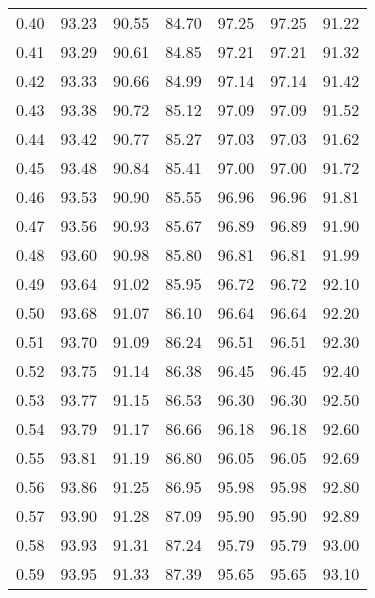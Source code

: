 \begin{tabular}{|c|c|c|c|c|c|c|}
      0.40 &     93.23 &     90.55 &      84.70 &   97.25 &      97.25 &         91.22 \\
      0.41 &     93.29 &     90.61 &      84.85 &   97.21 &      97.21 &         91.32 \\
      0.42 &     93.33 &     90.66 &      84.99 &   97.14 &      97.14 &         91.42 \\
      0.43 &     93.38 &     90.72 &      85.12 &   97.09 &      97.09 &         91.52 \\
      0.44 &     93.42 &     90.77 &      85.27 &   97.03 &      97.03 &         91.62 \\
      0.45 &     93.48 &     90.84 &      85.41 &   97.00 &      97.00 &         91.72 \\
      0.46 &     93.53 &     90.90 &      85.55 &   96.96 &      96.96 &         91.81 \\
      0.47 &     93.56 &     90.93 &      85.67 &   96.89 &      96.89 &         91.90 \\
      0.48 &     93.60 &     90.98 &      85.80 &   96.81 &      96.81 &         91.99 \\
      0.49 &     93.64 &     91.02 &      85.95 &   96.72 &      96.72 &         92.10 \\
      0.50 &     93.68 &     91.07 &      86.10 &   96.64 &      96.64 &         92.20 \\
      0.51 &     93.70 &     91.09 &      86.24 &   96.51 &      96.51 &         92.30 \\
      0.52 &     93.75 &     91.14 &      86.38 &   96.45 &      96.45 &         92.40 \\
      0.53 &     93.77 &     91.15 &      86.53 &   96.30 &      96.30 &         92.50 \\
      0.54 &     93.79 &     91.17 &      86.66 &   96.18 &      96.18 &         92.60 \\
      0.55 &     93.81 &     91.19 &      86.80 &   96.05 &      96.05 &         92.69 \\
      0.56 &     93.86 &     91.25 &      86.95 &   95.98 &      95.98 &         92.80 \\
      0.57 &     93.90 &     91.28 &      87.09 &   95.90 &      95.90 &         92.89 \\
      0.58 &     93.93 &     91.31 &      87.24 &   95.79 &      95.79 &         93.00 \\
      0.59 &     93.95 &     91.33 &      87.39 &   95.65 &      95.65 &         93.10 \\

\end{tabular}
